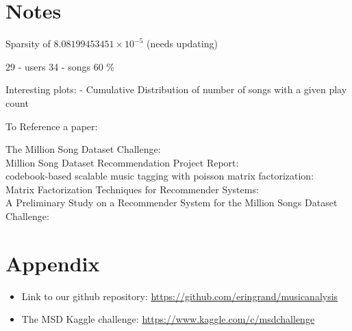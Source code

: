 \documentclass[12pt,preprint]{aastex}
\begin{document}
\section{Notes}
Sparsity of $8.08199453451\times 10^{-5}$ (needs updating)



29 - users
34 - songs 
60 \%

Interesting plots:
- Cumulative Distribution of number of songs with a given play count

To Reference a paper: 

The Million Song Dataset Challenge: \citep{McFee:2012:MSD:2187980.2188222} \\
Million Song Dataset Recommendation Project Report: \citep{li2012million} \\
codebook-based scalable music tagging with poisson matrix factorization: \citep{liangcodebook} \\
Matrix Factorization Techniques for Recommender Systems: \citep{koren2009matrix} \\
A Preliminary Study on a Recommender System for the Million Songs Dataset Challenge: \citep{aiolli2013preliminary} \\





\small{
\section{Appendix}

\begin{itemize}

  \item Link to our github repository: \url{https://github.com/eringrand/musicanalysis}
  \item The MSD Kaggle challenge: \url{https://www.kaggle.com/c/msdchallenge}

\end{itemize}
}
\end{document}
